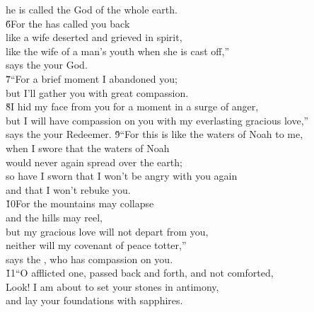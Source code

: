 \begin{poetry}
\poemll    he is called the God of the whole earth. \\
\poeml \v{6}For the  has called you back \\
\poemll    like a wife deserted and grieved in spirit, \\
\poeml like the wife of a man's youth when she is cast off,'' \\
\poemll    says the  your God. \\
\poeml \v{7}``For a brief moment I abandoned you; \\
\poemll    but I'll gather you with great compassion. \\
\poeml \v{8}I hid my face from you for a moment in a surge of anger, \\
\poemll    but I will have compassion on you with my everlasting gracious love,'' \\
\poemlll       says the  your Redeemer.
\poeml \v{9}``For this is like the waters of Noah to me, \\
\poemll    when I swore that the waters of Noah \\
\poemlll       would never again spread over the earth; \\
\poeml so have I sworn that I won't be angry with you again \\
\poemll    and that I won't rebuke you. \\
\poeml \v{10}For the mountains may collapse \\
\poemll    and the hills may reel, \\
\poeml but my gracious love will not depart from you, \\
\poemll    neither will my covenant of peace totter,'' \\
\poemlll       says the , who has compassion on you. \\
\poeml \v{11}``O afflicted one, passed back and forth, and not comforted, \\
\poemll    Look! I am about to set your stones in antimony, \\
\poemlll       and lay your foundations with sapphires. \\

\end{poetry}
